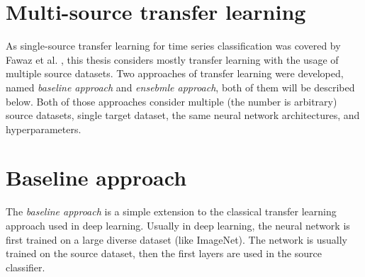 \documentclass[a4paper,11pt,twoside]{report}
\theoremstyle{definition}
\begin{document}
\FloatBarrier

\begin{table}[!h]
\centering
\tabcolsep=0.11cm
\caption{Summary of hyperparameters.}
\label{table:hyperparams}
\end{table}
\FloatBarrier
\section{Multi-source transfer learning}
As single-source transfer learning for time series classification was covered by Fawaz et al. \cite{transfer_learning_time_series}, this thesis considers mostly transfer learning with the usage of multiple source datasets. Two approaches of transfer learning were developed, named \textit{baseline approach} and \textit{ensebmle approach}, both of them will be described below. Both of those approaches consider multiple (the number is arbitrary) source datasets, single target dataset, the same neural network architectures, and hyperparameters.

\section{Baseline approach}\label{section:baseline}
The \textit{baseline approach} is a simple extension to the classical transfer learning approach used in deep learning. Usually in deep learning, the neural network is first trained on a large diverse dataset (like ImageNet). The network is usually trained on the source dataset, then the first layers are used in the source classifier.
\end{document}
